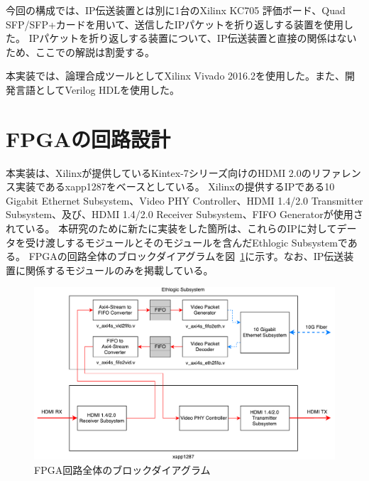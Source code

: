 
今回の構成では、IP伝送装置とは別に1台のXilinx KC705 評価ボード、Quad SFP/SFP+カードを用いて、送信したIPパケットを折り返しする装置を使用した。
IPパケットを折り返しする装置について、IP伝送装置と直接の関係はないため、ここでの解説は割愛する。

本実装では、論理合成ツールとしてXilinx Vivado 2016.2を使用した。また、開発言語としてVerilog HDLを使用した。

\section{FPGAの回路設計}

本実装は、Xilinxが提供しているKintex-7シリーズ向けのHDMI 2.0のリファレンス実装であるxapp1287\cite{xilinx-xapp1287}をベースとしている。
Xilinxの提供するIPである10 Gigabit Ethernet Subsystem\cite{xilinx-pg157}、Video PHY Controller\cite{xilinx-pg230}、HDMI 1.4/2.0 Transmitter Subsystem\cite{xilinx-pg235}、及び、HDMI 1.4/2.0 Receiver Subsystem\cite{xilinx-pg236}、FIFO Generator\cite{xilinx-pg057}が使用されている。
本研究のために新たに実装をした箇所は、これらのIPに対してデータを受け渡しするモジュールとそのモジュールを含んだEthlogic Subsystemである。
FPGAの回路全体のブロックダイアグラムを図~\ref{fig:fpga-whole-diagram}に示す。なお、IP伝送装置に関係するモジュールのみを掲載している。

\begin{figure}[htbp]
  \begin{center}
    \includegraphics[bb=0 0 738 423,width=15.5cm]{img/fpga-whole-diagram.pdf}
  \end{center}
  \caption{FPGA回路全体のブロックダイアグラム}
  \label{fig:fpga-whole-diagram}
\end{figure}

